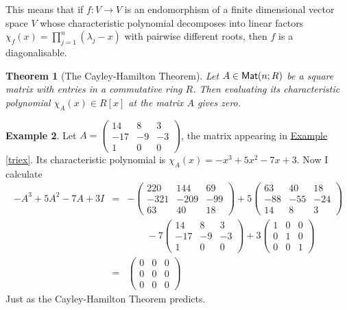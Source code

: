 \documentclass[11pt]{amsbook}
\newtheorem{theorem}{Theorem}[section]
\theoremstyle{definition}
\newtheorem{ex}[theorem]{Example}
\begin{document}
This means that if $f:V\to V$ is an endomorphism of a finite dimensional vector space $V$ whose characteristic polynomial decomposes into linear factors $\chi_f(x) = \prod_{j=1}^n (\lambda_j -x)$ with pairwise different roots, then $f$ is a diagonalisable.

\begin{theorem}[The Cayley-Hamilton Theorem] \label{CHthm} Let $A\in {\sf Mat}(n;R)$ be a square matrix with entries in a commutative ring $R$. Then evaluating its characteristic polynomial $\chi_A(x) \in R[x]$ at the matrix $A$ gives zero.
\end{theorem}

\begin{ex} Let $A = \begin{pmatrix} 14 & 8 & 3 \\  {-17} & -9 & -3 \\ {1} & {0} & 0\end{pmatrix}$, the matrix appearing in \hyperref[triex]{Example \ref{triex}}. Its characteristic polynomial is $\chi_A(x) = -x^3 + 5x^2 -7x + 3$. Now I calculate \begin{eqnarray*} - A^3 + 5 A^2 - 7A + 3I &=& - \begin{pmatrix} 220 & 144 & 69 \\ -321 & -209 & - 99 \\ 63 & 40 & 18 \end{pmatrix} +5\begin{pmatrix} 63 & 40 & 18 \\ -88 & -55 & -24 \\ 14 & 8 & 3 \end{pmatrix} \\ && \qquad -7 \begin{pmatrix} 14 & 8 & 3 \\  {-17} & -9 & -3 \\ {1} & {0} & 0\end{pmatrix}  + 3\begin{pmatrix} 1 & 0 & 0 \\ 0 & 1 & 0 \\ 0 & 0 & 1 \end{pmatrix} \\ & =& \begin{pmatrix} 0 & 0 & 0 \\ 0 & 0 & 0 \\ 0 & 0 & 0 \end{pmatrix}\end{eqnarray*} Just as the Cayley-Hamilton Theorem predicts.
\end{ex}
\end{document}
